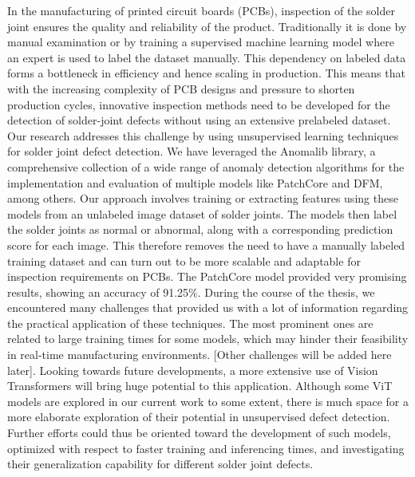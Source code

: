 \begin{abstract}
\end{abstract}
\sloppy
In the manufacturing of printed circuit boards (PCBs), inspection of the solder joint ensures the quality and reliability of the product. Traditionally it is done by manual examination or by training a supervised machine learning model where an expert is used to label the dataset manually. This dependency on labeled data forms a bottleneck in efficiency and hence scaling in production. This means that with the increasing complexity of PCB designs and pressure to shorten production cycles, innovative inspection methods need to be developed for the detection of solder-joint defects without using an extensive prelabeled dataset.
Our research addresses this challenge by using unsupervised learning techniques for solder joint defect detection. We have leveraged the Anomalib library, a comprehensive collection of a wide range of anomaly detection algorithms for the implementation and evaluation of multiple models like PatchCore and DFM, among others. Our approach involves training or extracting features using these models from an unlabeled image dataset of solder joints. The models then label the solder joints as normal or abnormal, along with a corresponding prediction score for each image. This therefore removes the need to have a manually labeled training dataset and can turn out to be more scalable and adaptable for inspection requirements on PCBs. The PatchCore model provided very promising results, showing an accuracy of 91.25\%.
During the course of the thesis, we encountered many challenges that provided us with a lot of information regarding the practical application of these techniques. The most prominent ones are related to large training times for some models, which may hinder their feasibility in real-time manufacturing environments. [Other challenges will be added here later]. Looking towards future developments, a more extensive use of Vision Transformers will bring huge potential to this application. Although some ViT models are explored in our current work to some extent, there is much space for a more elaborate exploration of their potential in unsupervised defect detection. Further efforts could thus be oriented toward the development of such models, optimized with respect to faster training and inferencing times, and investigating their generalization capability for different solder joint defects.